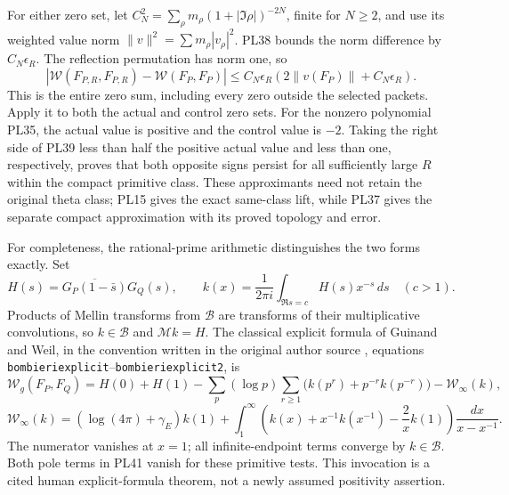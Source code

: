 For either zero set, let \(C_N^2=\sum_\rho
m_\rho(1+|\Im\rho|)^{-2N}\), finite for \(N\ge2\), and use its
weighted value norm \(\|v\|^2=\sum m_\rho|v_\rho|^2\).
PL38 bounds the norm difference by \(C_N\epsilon_R\).
The reflection permutation has norm one, so
\[
 |\mathcal W(F_{P,R},F_{P,R})-\mathcal W(F_P,F_P)|
 \le C_N\epsilon_R(2\|v(F_P)\|+C_N\epsilon_R).
 \tag{PL39}\label{pl:pl:error}
\]
This is the entire zero sum, including every zero outside the
selected packets. Apply it to both the actual and control zero sets.
For the nonzero polynomial PL35, the actual value is positive
and the control value is \(-2\). Taking the right side of PL39
less than half the positive actual value and less than one,
respectively, proves that both opposite signs persist for all
sufficiently large \(R\) within the compact primitive class.
These approximants need not retain the original theta class;
PL15 gives the exact same-class lift, while PL37 gives the
separate compact approximation with its proved topology and error.

For completeness, the rational-prime arithmetic distinguishes the
two forms exactly. Set
\[
 H(s)=\overline{G_P(1-\bar s)}G_Q(s),\qquad
 k(x)=\frac1{2\pi i}\int_{\Re s=c}H(s)x^{-s}\,ds\quad(c>1).
 \tag{PL40}\label{pl:pl:correlation}
\]
Products of Mellin transforms from \(\mathscr B\) are transforms of their
multiplicative convolutions, so \(k\in\mathscr B\) and \(\mathcal M k=H\).
The classical explicit formula of Guinand and Weil, in the
convention written in the original author source \cite{PLConnes},
equations \texttt{bombieriexplicit}--\texttt{bombieriexplicit2}, is
\[
 \mathcal W_g(F_P,F_Q)
 =H(0)+H(1)
 -\sum_p(\log p)\sum_{r\ge1}\bigl(k(p^r)+p^{-r}k(p^{-r})\bigr)
 -\mathcal W_\infty(k),
 \tag{PL41}\label{pl:pl:explicit}
\]
\[
 \mathcal W_\infty(k)=(\log(4\pi)+\gamma_E)k(1)
 +\int_1^\infty
 \left(k(x)+x^{-1}k(x^{-1})-\frac2x k(1)\right)
                    \frac{dx}{x-x^{-1}}.
 \tag{PL42}
\]
The numerator vanishes at \(x=1\); all infinite-endpoint terms
converge by \(k\in\mathscr B\). Both pole terms in PL41 vanish for these
primitive tests. This invocation is a cited human explicit-formula
theorem, not a newly assumed positivity assertion.

